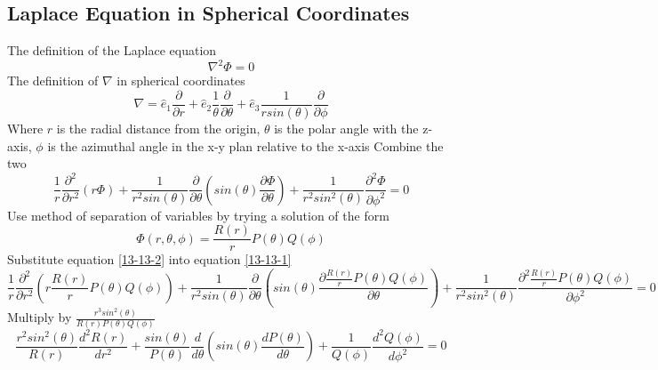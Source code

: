 \documentclass[12pt]{article}
\begin{document}
\subsection{Laplace Equation in Spherical Coordinates} \label{lapSph}
    The definition of the Laplace equation
    \begin{equation} \label{eq: a2-1}
        \nabla^2 \Phi = 0
    \end{equation}
    The definition of $\nabla$ in spherical coordinates
    \begin{equation} \label{eq: a2-2}
        \nabla = \hat{e}_1 \frac{\partial}{\partial r} + \hat{e}_2 \frac{1}{\theta} \frac{\partial}{\partial \theta} + \hat{e}_3 \frac{1}{r sin(\theta)}\frac{\partial}{\partial \phi}
    \end{equation}
    Where $r$ is the radial distance from the origin, $\theta$ is the polar angle with the z-axis, $\phi$ is the azimuthal angle in the x-y plan relative to the x-axis
    \newline Combine the two
    \begin{equation} \label{13-13-1}
        \frac{1}{r} \frac{\partial^2}{\partial r^2} (r \Phi) + \frac{1}{r^2 sin(\theta)} \frac{\partial}{\partial \theta} (sin(\theta) \frac{\partial \Phi}{\partial \theta}) + \frac{1}{r^2 sin^2(\theta)} \frac{\partial^2 \Phi}{\partial \phi^2} = 0
    \end{equation}
    Use method of separation of variables by trying a solution of the form
    \begin{equation} \label{13-13-2}
        \Phi(r,\theta,\phi) = \frac{R(r)}{r} P(\theta) Q(\phi)
    \end{equation}
    Substitute equation \ref{13-13-2} into equation \ref{13-13-1}
    \begin{equation} \label{13-13-3}
        \frac{1}{r} \frac{\partial^2}{\partial r^2} (r \frac{R(r)}{r} P(\theta) Q(\phi)) + \frac{1}{r^2 sin(\theta)} \frac{\partial}{\partial \theta} (sin(\theta) \frac{\partial \frac{R(r)}{r} P(\theta) Q(\phi)}{\partial \theta}) + \frac{1}{r^2 sin^2(\theta)} \frac{\partial^2 \frac{R(r)}{r} P(\theta) Q(\phi)}{\partial \phi^2} = 0
    \end{equation}
    Multiply by $\frac{r^3 sin^2(\theta)}{R(r) P(\theta) Q(\phi)}$
    \begin{equation} \label{13-13-4}
        \frac{r^2 sin^2(\theta)}{R(r)} \frac{d^2 R(r)}{dr^2} + \frac{sin(\theta)}{P(\theta)} \frac{d}{d\theta}(sin(\theta) \frac{dP(\theta)}{d\theta}) + \frac{1}{Q(\phi)} \frac{d^2Q(\phi)}{d\phi^2} = 0
    \end{equation}
\end{document}
